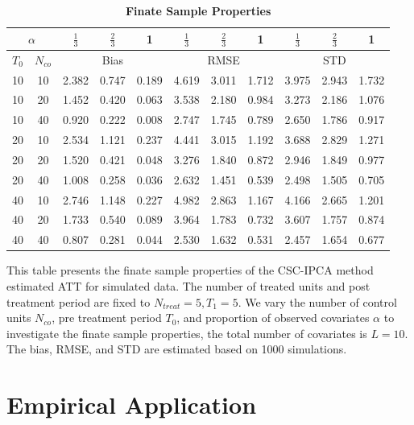 \documentclass[12pt]{article}
\begin{document}
\begin{table}[!ht]
\centering
\caption{\textbf{Finate Sample Properties}}
\label{tab: finate sample}
\begin{tabular}{cc|ccc|ccc|ccc}
\toprule
\multicolumn{2}{c|}{$\alpha$} & $\frac{1}{3}$ & $\frac{2}{3}$ & 1 & $\frac{1}{3}$ & $\frac{2}{3}$ & 1 & $\frac{1}{3}$ & $\frac{2}{3}$ & 1 \\
\hline
$T_0$ & $N_{co}$ & \multicolumn{3}{c|}{Bias} & \multicolumn{3}{c|}{RMSE}  & \multicolumn{3}{c}{STD} \\
\hline
10 & 10 & 2.382 & 0.747 & 0.189 & 4.619 & 3.011 & 1.712 & 3.975 & 2.943 & 1.732 \\
10 & 20 & 1.452 & 0.420 & 0.063 & 3.538 & 2.180 & 0.984 & 3.273 & 2.186 & 1.076 \\
10 & 40 & 0.920 & 0.222 & 0.008 & 2.747 & 1.745 & 0.789 & 2.650 & 1.786 & 0.917 \\
\cline{1-11}
20 & 10 & 2.534 & 1.121 & 0.237 & 4.441 & 3.015 & 1.192 & 3.688 & 2.829 & 1.271 \\
20 & 20 & 1.520 & 0.421 & 0.048 & 3.276 & 1.840 & 0.872 & 2.946 & 1.849 & 0.977 \\
20 & 40 & 1.008 & 0.258 & 0.036 & 2.632 & 1.451 & 0.539 & 2.498 & 1.505 & 0.705 \\
\cline{1-11}
40 & 10 & 2.746 & 1.148 & 0.227 & 4.982 & 2.863 & 1.167 & 4.166 & 2.665 & 1.201 \\
40 & 20 & 1.733 & 0.540 & 0.089 & 3.964 & 1.783 & 0.732 & 3.607 & 1.757 & 0.874 \\
40 & 40 & 0.807 & 0.281 & 0.044 & 2.530 & 1.632 & 0.531 & 2.457 & 1.654 & 0.677 \\
\bottomrule
\end{tabular}
\begin{tablenotes}
    \item This table presents the finate sample properties of the CSC-IPCA method estimated ATT for simulated data. The number of treated units and post treatment period are fixed to $N_{treat} = 5, T_1=5$. We vary the number of control units $N_{co}$, pre treatment period $T_0$, and proportion of observed covariates $\alpha$ to investigate the finate sample properties, the total number of covariates is $L=10$. The bias, RMSE, and STD are estimated based on 1000 simulations.
\end{tablenotes}
\end{table}
\section{Empirical Application}
\label{sec: application}
\end{document}
